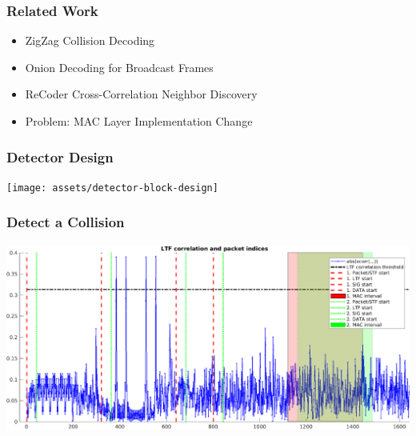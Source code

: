 \documentclass[accentcolor=tud8b,colorbacktitle]{tudbeamer}
\begin{document}
\begin{frame}
\frametitle{Related Work}
\begin{itemize}
	\setlength\itemsep{1em}
	\item ZigZag \cite{gollakota2008} Collision Decoding
	\item Onion Decoding \cite{wang2010} for Broadcast Frames
	\item ReCoder \cite{meng2015} Cross-Correlation Neighbor Discovery
	\vspace{0.2cm}
	\item Problem: MAC Layer Implementation Change
\end{itemize}
\end{frame}


\begin{frame}
\frametitle{Detector Design}
\begin{centering}
	\vspace{0.7cm}
	\texttt{[image: assets/detector-block-design]}\\
\end{centering}
\end{frame}


\begin{frame}
\frametitle{Detect a Collision}
\begin{centering}
	\includegraphics[width=\textwidth]{assets/preamble}\\
\end{centering}
\end{frame}
\end{document}
